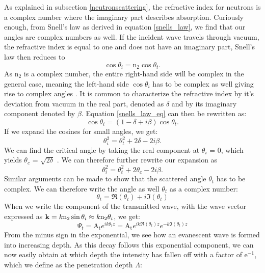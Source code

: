 As explained in subsection \ref{neutronscattering}, the refractive index for neutrons is a complex number where the imaginary part describes absorption. Curiously enough, from Snell's law as derived in equation \ref{snells_law}, we find that our angles are complex numbers as well. If the incident wave travels through vacuum, the refractive index is equal to one and does not have an imaginary part, Snell's law then reduces to
\begin{equation}\label{snells_law_eq}
 \cos\theta_i = \textrm{n}_2 \cos\theta_t.
\end{equation}
As $\textrm{n}_2$ is a complex number, the entire right-hand side will be complex in the general case, meaning the left-hand side $\cos\theta_i$ has to be complex as well giving rise to complex angles \cite{salditt_gisaxs, nielsen_xray}. It is common to characterize the refractive index by it's deviation from vacuum in the real part, denoted as $\delta$ and by its imaginary component denoted by $\beta$. Equation \ref{snells_law_eq} can then be rewritten as:
\begin{equation}
	 \cos\theta_i = (1 - \delta + i\beta) \cos\theta_t.
\end{equation}
If we expand the cosines for small angles, we get:
\begin{equation}\label{theta_expansion}
	\theta_i^2 = \theta_t^2 + 2\delta - 2i\beta.
\end{equation}
We can find the critical angle by taking the real component at $\theta_i$ = 0, which yields $\theta_c$ = $\sqrt{2\delta}$ \cite{nielsen_xray}. We can therefore further rewrite our expansion as
\begin{equation}
	\theta_i^2 = \theta_t^2 + 2\theta_c - 2i\beta.
\end{equation}
 Similar arguments can be made to show that the scattered angle $\theta_t$ has to be complex. We can therefore write the angle as well $\theta_t$ as a complex number:
\begin{equation}
\theta_t = \Re(\theta_t) + i\Im(\theta_t)
\end{equation}
When we write the component of the transmitted wave, with the wave vector expressed as $\vb{k} = k \textrm{n}_2\sin\theta_i \approx k \textrm{n}_2 \theta_i$, we get:
\begin{equation}
	\Psi_t = \textrm{A}_\textrm{t}e^{i k\theta_tz} =  \textrm{A}_\textrm{t}e^{i k \Re(\theta_t)z}  e^{- k \Im(\theta_t)z}
\end{equation}
From the minus sign in the exponential, we see how an evanescent wave is formed into increasing depth. As this decay follows this exponential component, we can now easily obtain at which depth the intensity has fallen off with a factor of e$^{-1}$, which we define as the penetration depth $\Lambda$:
